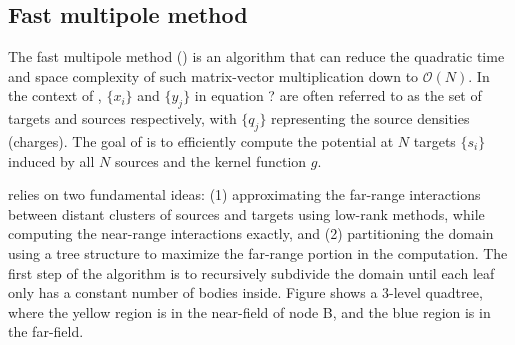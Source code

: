 \subsection{Fast multipole method}

The fast multipole method (\fmm) is an algorithm that can reduce the quadratic time and space complexity of such matrix-vector multiplication down to $\mathcal{O}(N)$.
In the context of \fmm, $\{x_i\}$ and $\{y_j\}$ in equation ? are often referred to as the set of targets and sources respectively, with $\{q_j\}$ representing the source densities (charges).
The goal of \fmm is to efficiently compute the potential at $N$ targets $\{s_i\}$ induced by all $N$ sources and the kernel function $g$.

\fmm relies on two fundamental ideas: (1) approximating the far-range interactions between distant clusters of sources and targets using low-rank methods, while computing the near-range interactions exactly, and (2) partitioning the domain using a tree structure to maximize the far-range portion in the computation.
The first step of the algorithm is to recursively subdivide the domain until each leaf only has a constant number of bodies inside.
Figure shows a 3-level quadtree, where the yellow region is in the near-field of node B, and the blue region is in the far-field.